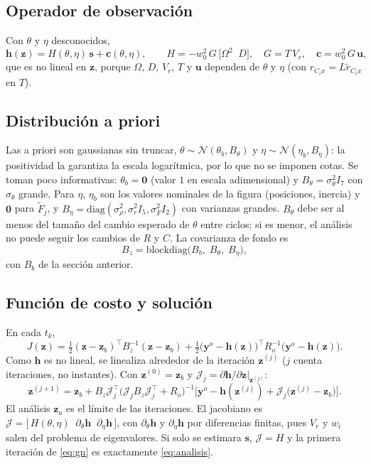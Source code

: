 \subsection{Operador de observación}

Con $\theta$ y $\eta$ desconocidos,
\[
\mathbf h(\mathbf z)=H(\theta,\eta)\,\mathbf s+\mathbf c(\theta,\eta),\qquad
H=-w_0^2\,G\,\big[\Omega^2\;\;D\big],\quad G=T\,V_r,\quad \mathbf c=w_0^2\,G\,\mathbf u,
\]
que es no lineal en $\mathbf z$, porque $\Omega$, $D$, $V_r$, $T$ y $\mathbf u$ dependen de $\theta$ y $\eta$ (con $r_{C_ix}=L\tilde r_{C_ix}$ en $T$).

\subsection{Distribución a priori}

Las a priori son gaussianas sin truncar, $\theta\sim\mathcal N(\theta_b,B_\theta)$ y $\eta\sim\mathcal N(\eta_b,B_\eta)$: la positividad la garantiza la escala logarítmica, por lo que no se imponen cotas. Se toman poco informativas: $\theta_b=\mathbf 0$ (valor $1$ en escala adimensional) y $B_\theta=\sigma_\theta^2I_7$ con $\sigma_\theta$ grande. Para $\eta$, $\eta_b$ son los valores nominales de la figura (posiciones, inercia) y $\mathbf 0$ para $\tilde F_j$, y $B_\eta=\mathrm{diag}(\sigma_\rho^2,\sigma_r^2I_5,\sigma_F^2I_2)$ con varianzas grandes. $B_\theta$ debe ser al menos del tamaño del cambio esperado de $\theta$ entre ciclos; si es menor, el análisis no puede seguir los cambios de $R$ y $C$. La covarianza de fondo es
\[
B_z=\mathrm{blockdiag}\big(B_b,\;B_\theta,\;B_\eta\big),
\]
con $B_b$ de la sección anterior.

\subsection{Función de costo y solución}

En cada $t_k$,
\[
J(\mathbf z)=\tfrac12(\mathbf z-\mathbf z_b)^\top B_z^{-1}(\mathbf z-\mathbf z_b)
+\tfrac12\big(\mathbf y^o-\mathbf h(\mathbf z)\big)^\top R_o^{-1}\big(\mathbf y^o-\mathbf h(\mathbf z)\big).
\]
Como $\mathbf h$ es no lineal, se linealiza alrededor de la iteración $\mathbf z^{(j)}$ ($j$ cuenta iteraciones, no instantes). Con $\mathbf z^{(0)}=\mathbf z_b$ y $\mathcal J_j=\partial\mathbf h/\partial\mathbf z\big|_{\mathbf z^{(j)}}$:
\begin{equation}\label{eq:gn}
\mathbf z^{(j+1)}=\mathbf z_b+B_z\mathcal J_j^\top\big(\mathcal J_jB_z\mathcal J_j^\top+R_o\big)^{-1}
\Big[\mathbf y^o-\mathbf h(\mathbf z^{(j)})+\mathcal J_j\big(\mathbf z^{(j)}-\mathbf z_b\big)\Big].
\end{equation}
El análisis $\mathbf z_a$ es el límite de las iteraciones. El jacobiano es $\mathcal J=\big[\,H(\theta,\eta)\;\;\partial_\theta\mathbf h\;\;\partial_\eta\mathbf h\,\big]$, con $\partial_\theta\mathbf h$ y $\partial_\eta\mathbf h$ por diferencias finitas, pues $V_r$ y $w_i$ salen del problema de eigenvalores. Si solo se estimara $\mathbf s$, $\mathcal J=H$ y la primera iteración de \eqref{eq:gn} es exactamente \eqref{eq:analisis}.

